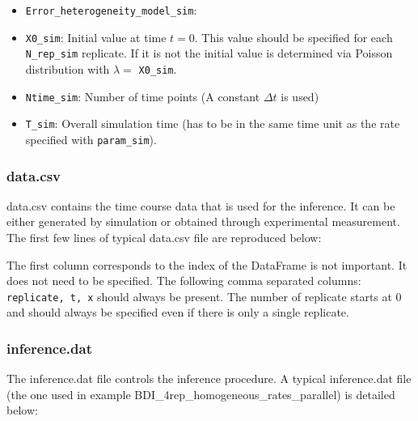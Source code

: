\documentclass[]{article}   %
\begin{document}
\begin{itemize}
\begin{description}
\end{description}
\item {\tt{Error\_heterogeneity\_model\_sim}}:
\item {\tt{X0\_sim}}: Initial value at time $t=0$. This value should be specified for each {\tt N\_rep\_sim} replicate. If it is not the initial value is determined via Poisson distribution with $\lambda=$ {\tt X0\_sim}.
\item {\tt{Ntime\_sim}}: Number of time points (A constant $\Delta t$ is used)
\item {\tt{T\_sim}}: Overall simulation time (has to be in the same time unit as the rate specified with {\tt{param\_sim}}).
 \end{itemize}
		
	
      \subsubsection{data.csv}
      data.csv contains the time course data that is used for the inference. It can be either generated by simulation or obtained through experimental measurement. The first few lines of typical data.csv file are reproduced below:
	
      The first column corresponds to the index of the DataFrame is not important. It does not need to be specified. The following comma separated columns: {\tt replicate, t, x} should always be present. The number of replicate starts at 0 and should always be specified even if there is only a single replicate.
\newpage      
  \subsubsection{inference.dat}
  
  The inference.dat file controls the inference procedure. A typical inference.dat file (the one used in example BDI\_4rep\_homogeneous\_rates\_parallel) is detailed below:
        
\end{document}
